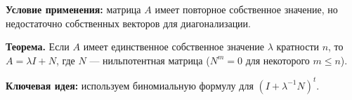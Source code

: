 \textbf{Условие применения:} матрица $A$ имеет повторное собственное значение, но недостаточно собственных векторов для диагонализации.

\textbf{Теорема.} Если $A$ имеет единственное собственное значение $\lambda$ кратности $n$, то $A = \lambda I + N$, где $N$ — нильпотентная матрица ($N^m = 0$ для некоторого $m \leq n$).

\textbf{Ключевая идея:} используем биномиальную формулу для $(I + \lambda^{-1}N)^t$.


